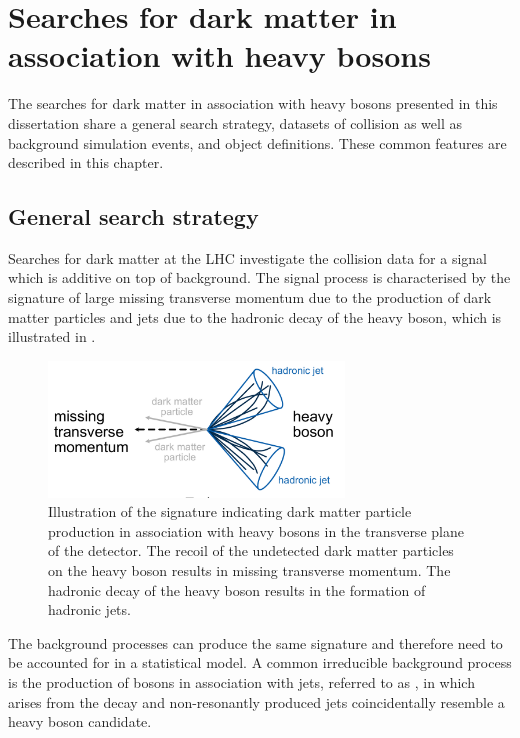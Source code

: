 %
\chapter{Searches for dark matter in association with heavy bosons}
\label{ch:common}
The searches for dark matter in association with heavy bosons presented in this dissertation share a general search strategy, datasets of collision as well as background simulation events, and object definitions.
These common features are described in this chapter.

\section{General search strategy}
\label{sec:common:analysis}
Searches for dark matter at the LHC investigate the \HepProcess{\Pp\Pp} collision data for a signal which is additive on top of background.
The signal process is characterised by the signature of large missing transverse momentum \met due to the production of dark matter particles and jets due to the hadronic decay of the heavy boson, which is illustrated in .

\begin{figure}[htbp]
  \centering
  \includegraphics[width=0.7\textwidth]{figures/common/common_signature.pdf}
  \caption{Illustration of the signature indicating dark matter particle production in association with heavy bosons in the transverse plane of the detector. The recoil of the undetected dark matter particles on the heavy boson results in missing transverse momentum. The hadronic decay of the heavy boson results in the formation of hadronic jets.}
  \label{fig:common:analysis:signature}
\end{figure}

The background processes can produce the same signature and therefore need to be accounted for in a statistical model.
A common irreducible background process is the production of \PZ bosons in association with jets, referred to as \zjets, in which \met arises from the \HepProcess{\PZ \to \Pgn \Pgn} decay and non-resonantly produced jets coincidentally resemble a heavy boson candidate.

